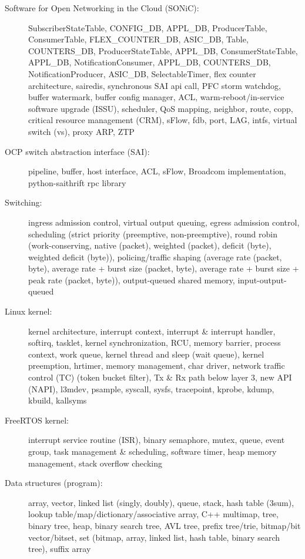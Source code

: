 \documentclass[letterpaper,11pt]{article}
\begin{document}
\begin{description}
\item[Software for Open Networking in the Cloud (SONiC):] SubscriberStateTable, CONFIG\_DB, APPL\_DB,
ProducerTable, ConsumerTable, FLEX\_COUNTER\_DB, ASIC\_DB,
Table, COUNTERS\_DB,
ProducerStateTable, APPL\_DB, ConsumerStateTable, APPL\_DB,
%
NotificationConsumer, APPL\_DB, COUNTERS\_DB, NotificationProducer, ASIC\_DB,
SelectableTimer,
flex counter architecture, sairedis, synchronous SAI api call, PFC storm watchdog,
buffer watermark, buffer config manager, ACL, warm-reboot/in-service software upgrade (ISSU), scheduler, QoS mapping,
neighbor, route, copp, critical resource management (CRM), sFlow, fdb, port, LAG, intfs,
virtual switch (vs), proxy ARP, ZTP

\item[OCP switch abstraction interface (SAI):] pipeline, buffer, host interface, ACL, sFlow,
Broadcom implementation, python-saithrift rpc library

\item[Switching:] ingress admission control, virtual output queuing, egress admission control,
scheduling (strict priority (preemptive, non-preemptive),
round robin (work-conserving, native (packet), weighted (packet), deficit (byte), weighted deficit (byte)),
policing/traffic shaping (average rate (packet, byte), average rate + burst size (packet, byte), average rate + burst size + peak rate (packet, byte)),
output-queued shared memory, input-output-queued

\item[Linux kernel:] kernel architecture, interrupt context, interrupt \& interrupt handler, softirq, tasklet, kernel synchronization,
RCU, memory barrier, process context, work queue, kernel thread and sleep (wait queue), kernel preemption, hrtimer, memory management,
char driver, network traffic control (TC) (token bucket filter), Tx \& Rx path below layer 3, new API (NAPI), l3mdev, psample,
syscall, sysfs, tracepoint, kprobe, kdump, kbuild, kallsyms

\item[FreeRTOS kernel:] interrupt service routine (ISR), binary semaphore, mutex, queue, event group, task management \& scheduling, software timer,
heap memory management, stack overflow checking

\item[Data structures (program):] array, vector, linked list (singly, doubly), queue, stack,
hash table (3sum), lookup table/map/dictionary/associative array, C++ multimap,
tree, binary tree, heap, binary search tree, AVL tree, prefix tree/trie,
bitmap/bit vector/bitset, set (bitmap, array, linked list, hash table, binary search tree),
suffix array


\end{description}
\end{document}
